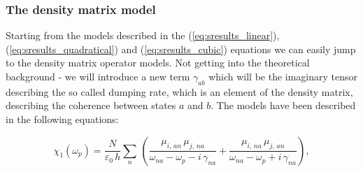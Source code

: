 \documentclass[12pt,twoside,a4paper]{article}
\numberwithin{equation}{subsection}
\numberwithin{figure}{subsection}
\begin{document}
\subsubsection*{The density matrix model}

Starting from the models described in the (\ref{eq:sresults_linear}), (\ref{eq:sresults_quadratical}) and (\ref{eq:sresults_cubic}) equations we can easily jump to the density matrix operator models. Not getting into the theoretical background - we will introduce a new term $\gamma_{ab}$ which will be the imaginary tensor describing the so called dumping rate, which is an element of the density matrix, describing the coherence between states $a$ and $b$. The models have been described in the following equations:

\begin{equation} \label{eq:ssmods_linear}
    {\chi_{1}}({\omega_{p}}) = \frac {N}{{\varepsilon_{0}}\,h}\sum_{n}\,(\frac {{\mu_{i, \,an}}\,{\mu_{j, \,na}}}{{\omega_{na}} -
    {\omega_{p}} - i\,{\gamma_{na}}} + \frac {{\mu_{i, \,na}}\,{\mu_{j, \,an}}}{{\omega_{na}} - {\omega_{p}} + i\,{\gamma_{na}}}),
\end{equation}
\end{document}
